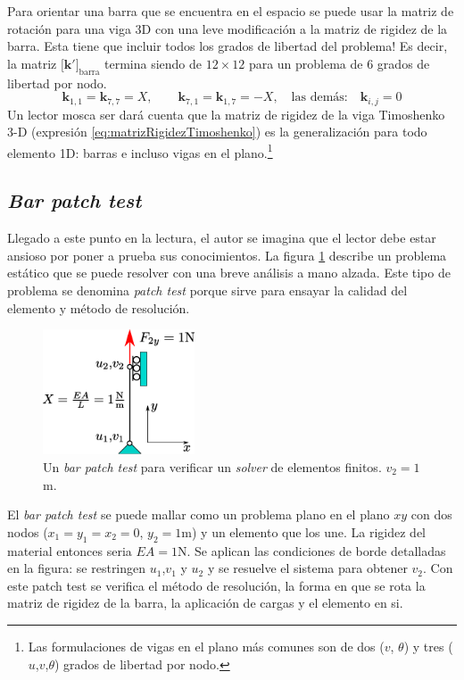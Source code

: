 \documentclass[11pt, a4paper,titlepage]{article}
\newcommand{\Mme}[1]{\boldsymbol{[}\mathbf{#1} \boldsymbol{]}}
\begin{document}
Para orientar una barra que se encuentra en el espacio se puede usar la matriz de rotación para una viga 3D con una leve modificación a la matriz de rigidez de la barra. Esta tiene que incluir todos los grados de libertad del problema! Es decir, la matriz $\Mme{k'}_{\mathrm{barra}}$ termina siendo de $12 \times 12$ para un problema de 6 grados de libertad por nodo.
\[
\mathbf{k}_{1,1}=\mathbf{k}_{7,7}=X, \qquad \mathbf{k}_{7,1}=\mathbf{k}_{1,7}=-X, \quad \text{las demás:} \quad \mathbf{k}_{i,j} = 0
\]
Un lector mosca ser dará cuenta que la matriz de rigidez de la viga Timoshenko 3-D (expresión \ref{eq:matrizRigidezTimoshenko}) es la generalización para todo elemento 1D: barras e incluso vigas en el plano.\footnote{Las formulaciones de vigas en el plano más comunes son de dos ($v$, $\theta$) y tres ($u$,$v$,$\theta$) grados de libertad por nodo.}

\subsection*{\textit{Bar patch test}}
Llegado a este punto en la lectura, el autor se imagina que el lector debe estar ansioso por poner a prueba sus conocimientos. La figura \ref{fig:barpatch} describe un problema estático que se puede resolver con una breve análisis a mano alzada. Este tipo de problema se denomina \textit{patch test} porque sirve para ensayar la calidad del elemento y método de resolución. 
\begin{figure}[htb!]
	\centering
	\includegraphics[width=0.4\textwidth]{fig/barpatch.eps}
	\caption{Un \textit{bar patch test} para verificar un \textit{solver} de elementos finitos. $v_2=1$m.}
	\label{fig:barpatch}
\end{figure}

El \textit{bar patch test} se puede mallar como un problema plano en el plano $xy$ con dos nodos ($x_1=y_1=x_2=0$, $y_2=1$m) y un elemento que los une. La rigidez del material entonces seria $EA=1$N. Se aplican las condiciones de borde detalladas en la figura: se restringen $u_1$,$v_1$ y $u_2$ y se resuelve el sistema para obtener $v_2$. Con este patch test se verifica el método de resolución, la forma en que se rota la matriz de rigidez de la barra, la aplicación de cargas y el elemento en si.
\end{document}
